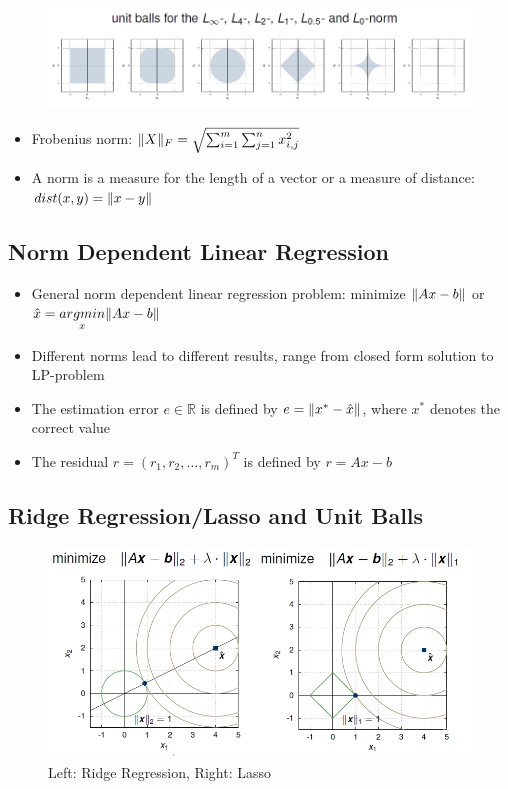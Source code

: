     \begin{figure}[H]
        \centering
        \includegraphics[scale=0.8]{figures/unit_ball}
    \end{figure}

\begin{itemize}
    \item 
        Frobenius norm: $\lVert X\rVert_F = \sqrt{\sum_{i=1}^m \sum_{j=1}^n x_{i,j}^2}$
    \item
        A norm is a measure for the length of a vector or a measure of distance: $dist(x,y) = \lVert x-y\rVert$
\end{itemize}

\subsection*{Norm Dependent Linear Regression}
\begin{itemize}
    \item
        General norm dependent linear regression problem: minimize $\lVert Ax - b\rVert$ or $\hat{x} = \underset{x}{argmin} \lVert Ax - b\rVert$
    \item
        Different norms lead to different results, range from closed form solution to LP-problem
    \item
        The estimation error $e \in \mathbb{R}$ is defined by $e = \lVert x^* - \hat{x}\rVert$, where $x^*$ denotes the correct value
    \item
        The residual $r=(r_1, r_2, \dots, r_m)^T$ is defined by $r = Ax -b$ 
\end{itemize}
\subsection*{Ridge Regression/Lasso and Unit Balls}
\begin{figure}[H]
    \centering
    \includegraphics[scale=0.6]{figures/ridge_lasso}
    \caption{Left: Ridge Regression, Right: Lasso}
\end{figure}
